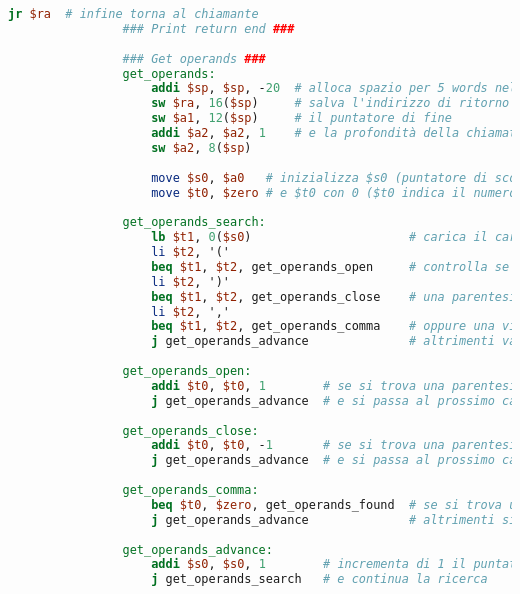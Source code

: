 \begin{center}
\begin{lstlisting}[language=mips, gobble=14, stepnumber=1]
                    jr $ra  # infine torna al chiamante
                ### Print return end ###
                
                ### Get operands ###
                get_operands:
                    addi $sp, $sp, -20  # alloca spazio per 5 words nello stack frame
                    sw $ra, 16($sp)     # salva l'indirizzo di ritorno
                    sw $a1, 12($sp)     # il puntatore di fine
                    addi $a2, $a2, 1    # e la profondità della chiamata incrementata di 1
                    sw $a2, 8($sp)
                
                    move $s0, $a0   # inizializza $s0 (puntatore di scorrimento) con il puntatore d'inizio
                    move $t0, $zero # e $t0 con 0 ($t0 indica il numero di parentesi aperte ma non ancora chiuse)
                    
                get_operands_search:
                    lb $t1, 0($s0)                      # carica il carattere puntato da $s0
                    li $t2, '('
                    beq $t1, $t2, get_operands_open     # controlla se è una parentesi aperta
                    li $t2, ')'
                    beq $t1, $t2, get_operands_close    # una parentesi chiusa
                    li $t2, ','
                    beq $t1, $t2, get_operands_comma    # oppure una virgola
                    j get_operands_advance              # altrimenti va avanti senza fare niente
                    
                get_operands_open:
                    addi $t0, $t0, 1        # se si trova una parentesi aperta si incremente $t0
                    j get_operands_advance  # e si passa al prossimo carattere
                    
                get_operands_close:
                    addi $t0, $t0, -1       # se si trova una parentesi chiusa si decremente $t0
                    j get_operands_advance  # e si passa al prossimo carattere
                    
                get_operands_comma:
                    beq $t0, $zero, get_operands_found  # se si trova una virgola e le parentesi sono bilanciate, allora si è trovato il punto di divisione
                    j get_operands_advance              # altrimenti si passa al prossimo carattere
                    
                get_operands_advance:
                    addi $s0, $s0, 1        # incrementa di 1 il puntatore $s0
                    j get_operands_search   # e continua la ricerca
                    

\end{lstlisting}
\end{center}
